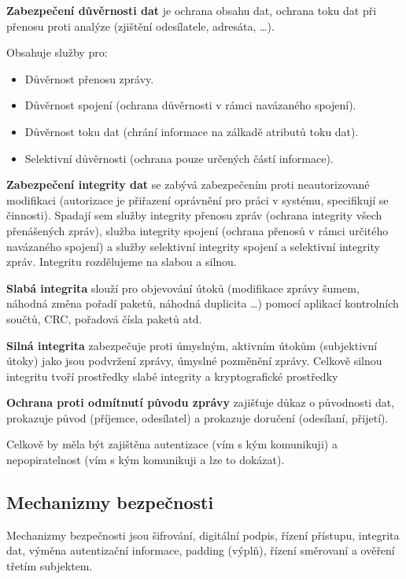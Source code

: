 \textbf{Zabezpečení důvěrnosti dat} je ochrana obsahu dat, ochrana toku dat při přenosu proti analýze (zjištění odesílatele, adresáta, \dots). 

\noindent Obsahuje služby pro:
\begin{itemize}[noitemsep]
    \item Důvěrnost přenosu zprávy.
    \item Důvěrnost spojení (ochrana důvěrnosti v rámci navázaného spojení).
    \item Důvěrnost toku dat (chrání informace na zálkadě atributů toku dat).
    \item Selektivní důvěrnosti (ochrana pouze určených částí informace).
\end{itemize}

\textbf{Zabezpečení integrity dat} se zabývá zabezpečením proti neautorizované modifikaci (autorizace je přiřazení oprávnění pro práci v systému, specifikují se činnosti). Spadají sem služby integrity přenosu zpráv (ochrana integrity všech přenášených zpráv), služba integrity spojení (ochrana přenosů v rámci určitého navázaného spojení) a služby selektivní integrity spojení a selektivní integrity zpráv.
Integritu rozdělujeme na slabou a silnou.

\noindent \textbf{Slabá integrita} slouží pro objevování útoků (modifikace zprávy šumem, náhodná změna pořadí paketů, náhodná duplicita \dots) pomocí aplikací kontrolních součtů, CRC, pořadová čísla paketů atd.

\noindent \textbf{Silná integrita} zabezpečuje proti úmyslným, aktivním útokům (subjektivní útoky) jako jsou podvržení zprávy, úmyslné pozměnění zprávy. Celkově silnou integritu tvoří prostředky slabé integrity a kryptografické prostředky


\textbf{Ochrana proti odmítnutí původu zprávy} zajišťuje důkaz o původnosti dat, prokazuje původ (příjemce, odesílatel) a prokazuje doručení (odesílaní, přijetí).

\vspace{0,5cm}
Celkově by měla být zajištěna autentizace (vím s kým komunikuji) a nepopiratelnost (vím s kým komunikuji a lze to dokázat).

\subsection{Mechanizmy bezpečnosti}

Mechanizmy bezpečnosti jsou šifrování, digitální podpis, řízení přístupu, integrita dat, výměna autentizační informace, padding (výplň), řízení směrovaní a ověření třetím subjektem.

